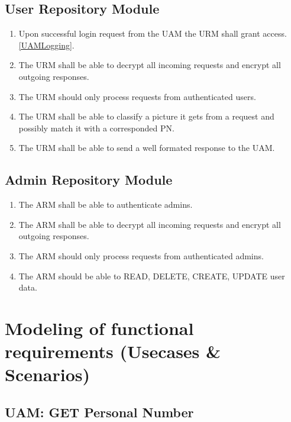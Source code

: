 \documentclass[a4paper,11pt]{article}
\begin{document}
\subsection{User Repository Module}
\begin{enumerate}[leftmargin=0.8in]
		\item Upon successful login request from the UAM the URM shall grant access. \ref{UAMLogging}.
		\item The URM shall be able to decrypt all incoming requests and encrypt all outgoing responses.
		\item The URM should only process requests from authenticated users.
		\item The URM shall be able to classify a picture it gets from a request and possibly match it with a corresponded PN.
		\item The URM shall be able to send a well formated response to the UAM.
\end{enumerate}

\subsection{Admin Repository Module}
\begin{enumerate}[leftmargin=0.8in]
		\item \label{ACMLogging} The ARM shall be able to authenticate admins.
		\item The ARM shall be able to decrypt all incoming requests and encrypt all outgoing responses.
		\item \label{ARMRequest} The ARM should only process requests from authenticated admins.
		\item The ARM should be able to READ, DELETE, CREATE, UPDATE user data.
\end{enumerate}

\newpage
\section{Modeling of functional requirements (Usecases \& Scenarios)}


\subsection{UAM: GET Personal Number}
\end{document}
